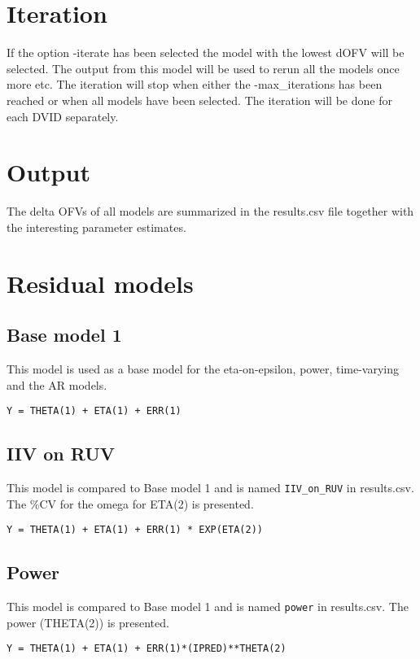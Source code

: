 \section{Iteration}
If the option -iterate has been selected the model with the lowest dOFV will be selected. The output from this model
will be used to rerun all the models once more etc. The iteration will stop when either the -max\_iterations has been
reached or when all models have been selected. The iteration will be done for each DVID separately.

\section{Output}
The delta OFVs of all models are summarized in the results.csv file together with the interesting parameter estimates.

\section{Residual models}

\subsection{Base model 1}
This model is used as a base model for the eta-on-epsilon, power, time-varying and the AR models.

\begin{verbatim}
Y = THETA(1) + ETA(1) + ERR(1)
\end{verbatim}

\subsection{IIV on RUV}
This model is compared to Base model 1 and is named \verb|IIV_on_RUV| in results.csv. The \%CV for the omega for ETA(2) is presented.

\begin{verbatim}
Y = THETA(1) + ETA(1) + ERR(1) * EXP(ETA(2))
\end{verbatim}

\subsection{Power}
This model is compared to Base model 1 and is named \verb|power| in results.csv. The power (THETA(2)) is presented.

\begin{verbatim}
Y = THETA(1) + ETA(1) + ERR(1)*(IPRED)**THETA(2)
\end{verbatim}

